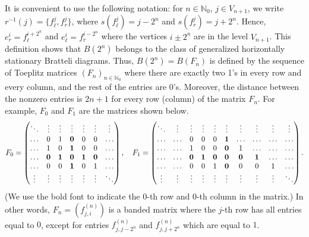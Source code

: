 \documentclass[11pt,reqno]{amsart}
\theoremstyle{definition}
\theoremstyle{remark}
\theoremstyle{plain}
\newcommand{\N}{\mathbb N}
\numberwithin{equation}{section}
\begin{document}
It is convenient to use the following notation: for $n \in \N_0$, $j \in V_{n+1}$, we write $r^{-1} (j) = \{f_{\ell}^j, f_r^j\}$, where $s(f_{\ell}^j) = j -2^n$ and $s(f_{r}^j) = j + 2^n$. Hence, $e^i_r = f_\ell^{i+2^n}$ and $e^i_\ell = f_r^{i-2^n}$ where the vertices $i \pm 2^n$ are in the level $V_{n+1}$.
This definition shows that $B(2^n)$ belongs to the class of generalized horizontally stationary Bratteli diagrams. 
Thus, $B(2^n) = B(F_n)$ is defined by the sequence of Toeplitz matrices $(F_n)_{n\in \N_0}$ where there are exactly two 1's in every row and every column, and the rest of the entries are $0$'s. Moreover, the distance between the nonzero entries is $2n +1$ for every row (column) of the matrix $F_n$. 
For example, $F_0$ and $F_1$ are the matrices shown below. 
$$F_0 = 
    \begin{pmatrix}
    \ddots & \vdots & \vdots & \vdots &\vdots &\vdots  &\vdots \\
     \ldots & 0 & 1 & \textbf 0 & 0  & 0 &\ldots\\
     \ldots & 1 & 0 & \textbf 1 & 0 & 0 &\ldots\\
     \ldots & \textbf 0 & \textbf 1 & \textbf 0  & \textbf 1 & \textbf 0 &\ldots\\
     \ldots & 0 & 0 & \textbf 1  & 0 & 1 &\ldots\\
     \vdots & \vdots & \vdots & \vdots& \vdots & \vdots & \ddots
    \end{pmatrix}, \quad
F_1 = 
    \begin{pmatrix}
    \ddots & \vdots & \vdots & \vdots & \vdots &\vdots &\vdots &\vdots &\vdots &\vdots\\
     \ldots &\ldots & 0 & 0 & 0 & \textbf 1 &\ldots &\ldots &\ldots &\ldots\\
     \ldots &\ldots & 1 & 0 & 0 & \textbf 0 & 1 & \ldots &\ldots &\ldots\\
     \ldots &\ldots &\textbf 0 & \textbf 1 & \textbf 0  & \textbf 0 & \textbf 0 & \textbf 1 &\ldots &\ldots\\
     \ldots &\ldots & 0 & 0 & 1  & \textbf 0 & 0 & 0 & 1 &\ldots \\
     \vdots & \vdots & \vdots & \vdots & \vdots & \vdots & \vdots & \vdots &\vdots & \ddots
    \end{pmatrix}. 
$$
(We use the bold font to indicate the 0-th row and 0-th column in the matrix.) In other words, $F_n = (f^{(n)}_{j,i})$ is a banded matrix where the $j$-th row has all entries equal to $0$, except for entries
$f^{(n)}_{j,j-2^n}$ and $f^{(n)}_{j,j+2^n}$ which are equal to $1$. 
\end{document}
